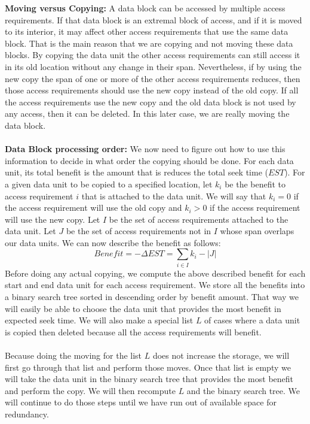 \documentclass[conference]{acmsiggraph}
\begin{document}
{\bf Moving versus Copying:} A data block can be accessed by multiple access requirements. If that data block is an extremal block of access, and if it is moved to its interior, it may affect other access requirements that use the same data block. That is the main reason that we are copying and not moving these data blocks. By copying the data unit the other access requirements can still access it in its old location without any change in their span. Nevertheless, if by using the new copy the span of one or more of the other access requirements reduces, then those access requirements should use the new copy instead of the old copy. If all the access requirements use the new copy and the old data block is not used by any access, then it can be deleted. In this later case, we are really moving the data block. \\
\\
{\bf Data Block processing order:} We now need to figure out how to use this information to decide in what order the copying should be done. For each data unit, its total benefit is the amount that is reduces the total seek time ($EST$). For a given data unit to be copied to a specified location, let $k_i$ be the benefit to access requirement $i$ that is attached to the data unit. We will say that $k_i=0$ if the access requirement will use the old copy and $k_i>0$ if the access requirement will use the new copy. Let $I$ be the set of access requirements attached to the data unit. Let $J$ be the set of access requirements not in $I$ whose span overlaps our data units. We can now describe the benefit as follows:
\[
Benefit = -\Delta EST = \sum_{i \in I} k_i - |J|
\]
Before doing any actual copying, we compute the above described benefit for each start and end data unit for each access requirement. We store all the benefits into a binary search tree sorted in descending order by benefit amount. That way we will easily be able to choose the data unit that provides the most benefit in expected seek time. We will also make a special list $L$ of cases where a data unit is copied then deleted because all the access requirements will benefit. \\
\\
Because doing the moving for the list $L$ does not increase the storage, we will first go through that list and perform those moves. Once that list is empty we will take the data unit in the binary search tree that provides the most benefit and perform the copy. We will then recompute $L$ and the binary search tree. We will continue to do those steps until we have run out of available space for redundancy.  
\end{document}
